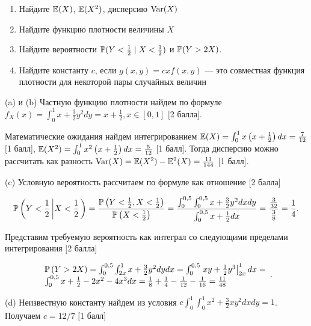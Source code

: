 \documentclass[pdftex,12pt,a4paper]{article}
\begin{document}
\begin{enumerate}
\begin{enumerate}
\item  Найдите $\E(X)$, $\E(X^{2})$, дисперсию $\Var(X)$

\item Найдите функцию плотности величины $X$

\item Найдите вероятности $\P(Y<\frac{1}{2} \mid X<\frac{1}{2} )$ и $\P(Y>2X)$.

\item Найдите константу $c$, если $g(x,y)=cxf(x,y)$ --- это совместная функция плотности для некоторой пары случайных величин
\end{enumerate}



\solution


(a) и (b) Частную функцию плотности найдем по формуле $f_{X} (x)=\int _{0}^{1}x+\frac{3}{2} y^{2}  dy=x+\frac{1}{2} ,x\in \left[0,1\right]$ $[$2 балла].

Математические ожидания найдем интегрированием $\E(X)=\int _{0}^{1}x\left(x+\frac{1}{2} \right) dx=\frac{7}{12} $ $[$1 балл],  $\E(X^{2} )=\int _{0}^{1}x^{2} \left(x+\frac{1}{2} \right) dx=\frac{5}{12} $ $[$1 балл]. Тогда дисперсию можно рассчитать как разность  $\Var(X)=\E(X^{2} )-\E^{2} (X)=\frac{11}{144} $ $[$1 балл].


(c) Условную вероятность рассчитаем по формуле как отношение $[$2 балла]

\[\P\left(Y<\frac{1}{2} \left|X<\frac{1}{2} \right. \right)=\frac{\P\left(Y<\frac{1}{2} ,X<\frac{1}{2} \right)}{\P\left(X<\frac{1}{2} \right)} =\frac{\int _{0}^{0,5}\int _{0}^{0,5}x+\frac{3}{2} y^{2}   dxdy}{\int _{0}^{0,5}x+\frac{1}{2}  dx} =\frac{\frac{3}{32} }{\frac{3}{8} } =\frac{1}{4} .\] 

Представим требуемую вероятность как интеграл со следующими пределами интегрирования $[$2 балла]

\[\begin{array}{l} {\P\left(Y>2X\right)=\int _{0}^{0,5}\int _{2x}^{1}x+\frac{3}{2} y^{2}   dydx=\int _{0}^{0,5}\left. xy+\frac{1}{2} y^{3} \right|_{2x}^{1} dx =} \\ {\int _{0}^{0,5}x+\frac{1}{2} -2x^{2} -4x^{3} dx= \frac{1}{8} +\frac{1}{4} -\frac{1}{12}  -\frac{1}{16} =\frac{11}{48} } \end{array}.\] 

(d) Неизвестную константу найдем из условия  $c\int _{0}^{1}\int _{0}^{1}x^2+\frac{3}{2} xy^{2}   dxdy=1$. Получаем $c=12/7$ $[$1 балл]





\end{enumerate}
\end{document}
